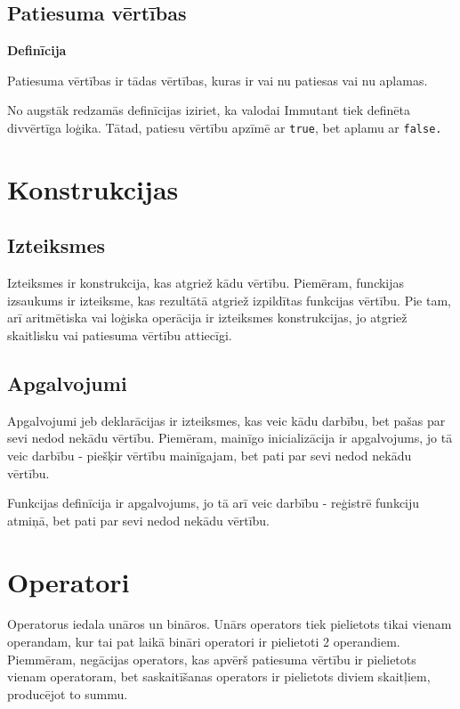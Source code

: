 \documentclass[12pt,a4paper]{report}
\begin{document}
\subsection{Patiesuma vērtības}

\textbf{Definīcija}

Patiesuma vērtības ir tādas vērtības, kuras ir vai nu patiesas vai nu aplamas.

No augstāk redzamās definīcijas iziriet, ka valodai Immutant tiek definēta divvērtīga loģika. Tātad, patiesu vērtību apzīmē ar \texttt{true}, bet aplamu ar \texttt{false.}

\section{Konstrukcijas}

\subsection{Izteiksmes}

Izteiksmes ir konstrukcija, kas atgriež kādu vērtību. Piemēram, funckijas izsaukums ir izteiksme, kas rezultātā atgriež izpildītas funkcijas vērtību. Pie tam, arī aritmētiska vai loģiska operācija ir izteiksmes konstrukcijas, jo atgriež skaitlisku vai patiesuma vērtību attiecīgi.

\subsection{Apgalvojumi}

Apgalvojumi jeb deklarācijas ir izteiksmes, kas veic kādu darbību, bet pašas par sevi nedod nekādu vērtību. Piemēram, mainīgo inicializācija ir apgalvojums, jo tā veic darbību - piešķir vērtību mainīgajam, bet pati par sevi nedod nekādu vērtību.

Funkcijas definīcija ir apgalvojums, jo tā arī veic darbību - reģistrē funkciju atmiņā, bet pati par sevi nedod nekādu vērtību.


\section{Operatori}
\label{section:operators}

Operatorus iedala unāros un bināros. Unārs operators tiek pielietots tikai vienam operandam, kur tai pat laikā bināri operatori ir pielietoti 2 operandiem. Piemmēram, negācijas operators, kas apvērš patiesuma vērtību ir pielietots vienam operatoram, bet saskaitīšanas operators ir pielietots diviem skaitļiem, producējot to summu.
\end{document}
